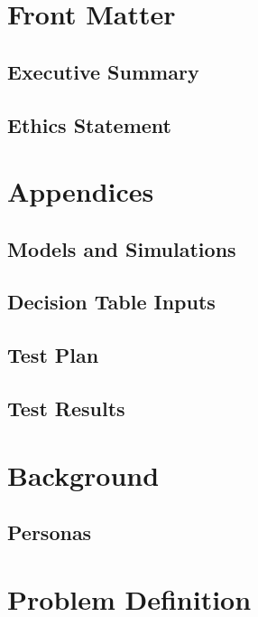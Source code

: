 \documentclass{article}
\begin{document}
\maketitle
\newpage

\section{Front Matter}
\subsection{Executive Summary}
\subsection{Ethics Statement}


\newpage
\tableofcontents
\newpage

\section{Appendices}
\subsection{Models and Simulations}
\subsection{Decision Table Inputs}
\subsection{Test Plan}

\subsection{Test Results}

\section{Background}
\subsection{Personas}






\section{Problem Definition}
\end{document}
